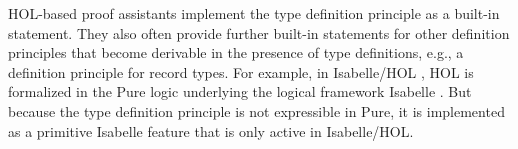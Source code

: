 HOL-based proof assistants implement the type definition principle as a built-in statement.
They also often provide further built-in statements for other definition principles that become derivable in the presence of type definitions, e.g., a definition principle for record types.
For example, in Isabelle/HOL \cite{isabellehol}, HOL is formalized in the Pure logic underlying the logical framework Isabelle \cite{isabelle}.
But because the type definition principle is not expressible in Pure, it is implemented as a primitive Isabelle feature that is only active in Isabelle/HOL.



